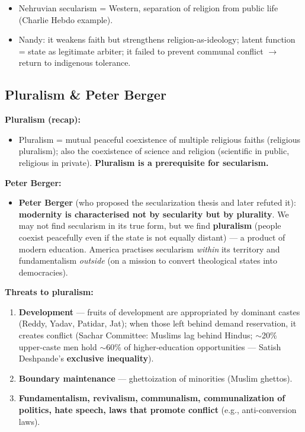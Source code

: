 \begin{QuickRevision}
\begin{itemize}
\item Nehruvian secularism = Western, separation of religion from public life (Charlie Hebdo example).
\item Nandy: it weakens faith but strengthens religion-as-ideology; latent function = state as legitimate arbiter; it failed to prevent communal conflict $\rightarrow$ return to indigenous tolerance.
\end{itemize}
\end{QuickRevision}

\sectiondivider

\subsection{Pluralism \& Peter Berger}

\begin{KeyConcept}
\textbf{Pluralism (recap):}
\begin{itemize}
\item Pluralism = mutual peaceful coexistence of multiple religious faiths (religious pluralism); also the coexistence of science and religion (scientific in public, religious in private). \textbf{Pluralism is a prerequisite for secularism.}
\end{itemize}
\end{KeyConcept}

\begin{CriticalPoint}
\textbf{Peter Berger:}
\begin{itemize}
\item \textbf{Peter Berger} (who proposed the secularization thesis and later refuted it): \textbf{modernity is characterised not by secularity but by plurality}. We may not find secularism in its true form, but we find \textbf{pluralism} (people coexist peacefully even if the state is not equally distant) --- a product of modern education. America practises secularism \textit{within} its territory and fundamentalism \textit{outside} (on a mission to convert theological states into democracies).
\end{itemize}
\end{CriticalPoint}

\begin{CriticalPoint}
\textbf{Threats to pluralism:}
\begin{enumerate}
\item \textbf{Development} --- fruits of development are appropriated by dominant castes (Reddy, Yadav, Patidar, Jat); when those left behind demand reservation, it creates conflict (Sachar Committee: Muslims lag behind Hindus; $\sim$20\% upper-caste men hold $\sim$60\% of higher-education opportunities --- Satish Deshpande's \textbf{exclusive inequality}).
\item \textbf{Boundary maintenance} --- ghettoization of minorities (Muslim ghettos).
\item \textbf{Fundamentalism, revivalism, communalism, communalization of politics, hate speech, laws that promote conflict} (e.g., anti-conversion laws).
\end{enumerate}
\end{CriticalPoint}

